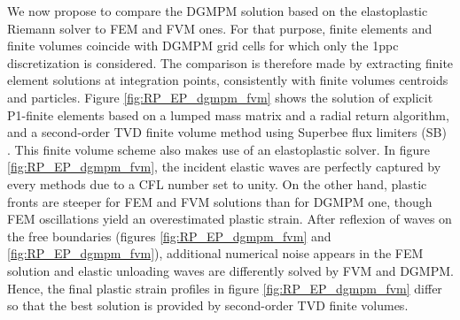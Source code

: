 We now propose to compare the DGMPM solution based on the elastoplastic Riemann solver to FEM and FVM ones. For that purpose, finite elements and finite volumes coincide with DGMPM grid cells for which only the 1ppc discretization is considered. The comparison is therefore made by extracting finite element solutions at integration points, consistently with finite volumes centroids and particles. Figure \ref{fig:RP_EP_dgmpm_fvm} shows the solution of explicit P1-finite elements based on a lumped mass matrix and a radial return algorithm, and a second-order TVD finite volume method using Superbee flux limiters (SB) \cite{Thomas_EP}. This finite volume scheme also makes use of an elastoplastic solver.
In figure \ref{fig:RP_EP_dgmpm_fvm}, the incident elastic waves are perfectly captured by every methods due to a CFL number set to unity. On the other hand, plastic fronts are steeper for FEM and FVM solutions than for DGMPM one, though FEM oscillations yield an overestimated plastic strain. 
After reflexion of waves on the free boundaries (figures \ref{fig:RP_EP_dgmpm_fvm} and \ref{fig:RP_EP_dgmpm_fvm}), additional numerical noise appears in the FEM solution and elastic unloading waves are differently solved by FVM and DGMPM. Hence, the final plastic strain profiles in figure \ref{fig:RP_EP_dgmpm_fvm} differ so that the best solution is provided by second-order TVD finite volumes.

